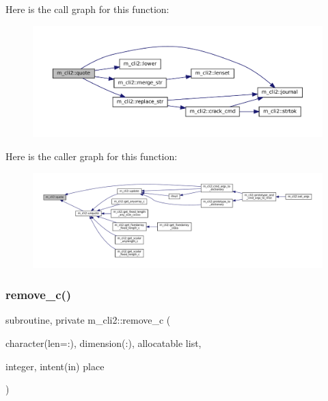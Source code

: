Here is the call graph for this function\+:\nopagebreak
\begin{figure}[H]
\begin{center}
\leavevmode
\includegraphics[width=350pt]{namespacem__cli2_a63f81a2c027eb5f3e0a77167ac29fc73_cgraph}
\end{center}
\end{figure}
Here is the caller graph for this function\+:\nopagebreak
\begin{figure}[H]
\begin{center}
\leavevmode
\includegraphics[width=350pt]{namespacem__cli2_a63f81a2c027eb5f3e0a77167ac29fc73_icgraph}
\end{center}
\end{figure}
\mbox{\label{namespacem__cli2_a155af513c048d68552ec2e8fb54e1294}} 
\subsubsection{\texorpdfstring{remove\+\_\+c()}{remove\_c()}}
{\footnotesize\ttfamily subroutine, private m\+\_\+cli2\+::remove\+\_\+c (\begin{DoxyParamCaption}\item[{character(len=\+:), dimension(\+:), allocatable}]{list,  }\item[{integer, intent(in)}]{place }\end{DoxyParamCaption})\hspace{0.3cm}{\ttfamily [private]}}




